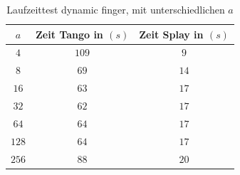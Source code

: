 \documentclass[a4paper,12pt]{article}
\begin{document}
\begin{table}[H]
	\begin{center}
		\begin{tabular}[c]{|c|c|c|}
			\hline
			$a$ & Zeit Tango in $\left(s\right)$ &Zeit Splay in $\left(s\right)$ \\
			\hline
			$4$ & $109$ &$9$ \\
			\hline
			$8$  & $69$ &$14$  \\
			\hline
			$16$  & $63$ &$17$  \\
			\hline
			$32$  & $62$ &$17$  \\
			\hline
			$64$  & $64$ &$17$  \\
			\hline
			$128$  & $64$ &$17$  \\
			\hline
			$256$  & $88$ &$20$  \\
			\hline
		\end{tabular}
		\caption{Laufzeittest dynamic finger, mit unterschiedlichen $a$} 
	\end{center}
\end{table}
\end{document}
